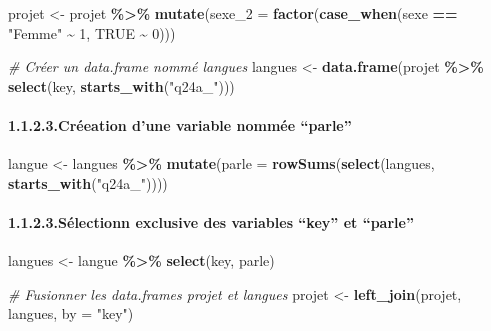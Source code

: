 \documentclass[
]{article}
\newenvironment{Shaded}{\begin{snugshade}}{\end{snugshade}}
\newcommand{\AttributeTok}[1]{\textcolor[rgb]{0.13,0.29,0.53}{#1}}
\newcommand{\CommentTok}[1]{\textcolor[rgb]{0.56,0.35,0.01}{\textit{#1}}}
\newcommand{\ConstantTok}[1]{\textcolor[rgb]{0.56,0.35,0.01}{#1}}
\newcommand{\DecValTok}[1]{\textcolor[rgb]{0.00,0.00,0.81}{#1}}
\newcommand{\FunctionTok}[1]{\textcolor[rgb]{0.13,0.29,0.53}{\textbf{#1}}}
\newcommand{\NormalTok}[1]{#1}
\newcommand{\OtherTok}[1]{\textcolor[rgb]{0.56,0.35,0.01}{#1}}
\newcommand{\SpecialCharTok}[1]{\textcolor[rgb]{0.81,0.36,0.00}{\textbf{#1}}}
\newcommand{\StringTok}[1]{\textcolor[rgb]{0.31,0.60,0.02}{#1}}
\begin{document}
\begin{Shaded}
\begin{Highlighting}[]
\NormalTok{projet }\OtherTok{\textless{}{-}}\NormalTok{ projet }\SpecialCharTok{\%\textgreater{}\%}
  \FunctionTok{mutate}\NormalTok{(}\AttributeTok{sexe\_2 =} \FunctionTok{factor}\NormalTok{(}\FunctionTok{case\_when}\NormalTok{(sexe }\SpecialCharTok{==} \StringTok{"Femme"} \SpecialCharTok{\textasciitilde{}} \DecValTok{1}\NormalTok{, }\ConstantTok{TRUE} \SpecialCharTok{\textasciitilde{}} \DecValTok{0}\NormalTok{)))}

\CommentTok{\# Créer un data.frame nommé langues}
\NormalTok{langues }\OtherTok{\textless{}{-}} \FunctionTok{data.frame}\NormalTok{(projet }\SpecialCharTok{\%\textgreater{}\%}
  \FunctionTok{select}\NormalTok{(key, }\FunctionTok{starts\_with}\NormalTok{(}\StringTok{"q24a\_"}\NormalTok{)))}
\end{Highlighting}
\end{Shaded}

\hypertarget{cruxe9eation-dune-variable-nommuxe9e-parle}{%
\paragraph{1.1.2.3.Créeation d'une variable nommée
``parle''}\label{cruxe9eation-dune-variable-nommuxe9e-parle}}

\begin{Shaded}
\begin{Highlighting}[]
\NormalTok{langue }\OtherTok{\textless{}{-}}\NormalTok{ langues }\SpecialCharTok{\%\textgreater{}\%}
  \FunctionTok{mutate}\NormalTok{(}\AttributeTok{parle =} \FunctionTok{rowSums}\NormalTok{(}\FunctionTok{select}\NormalTok{(langues, }\FunctionTok{starts\_with}\NormalTok{(}\StringTok{"q24a\_"}\NormalTok{))))}
\end{Highlighting}
\end{Shaded}

\hypertarget{suxe9lectionn-exclusive-des-variables-key-et-parle}{%
\paragraph{1.1.2.3.Sélectionn exclusive des variables ``key'' et
``parle''}\label{suxe9lectionn-exclusive-des-variables-key-et-parle}}

\begin{Shaded}
\begin{Highlighting}[]
\NormalTok{langues }\OtherTok{\textless{}{-}}\NormalTok{ langue }\SpecialCharTok{\%\textgreater{}\%}
  \FunctionTok{select}\NormalTok{(key, parle)}

\CommentTok{\# Fusionner les data.frames projet et langues}
\NormalTok{projet }\OtherTok{\textless{}{-}} \FunctionTok{left\_join}\NormalTok{(projet, langues, }\AttributeTok{by =} \StringTok{"key"}\NormalTok{)}
\end{Highlighting}
\end{Shaded}
\end{document}
